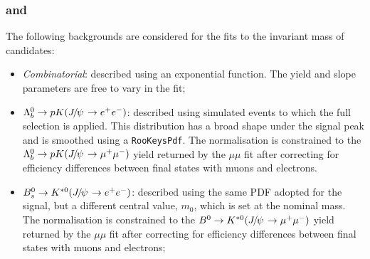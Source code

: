 \subsubsection*{\BdToKstJPs and \BdToKstPsi}

The following backgrounds are considered for the fits to the invariant mass of \BdToKstJPsee candidates:
%
\begin{itemize}

\item \textit{Combinatorial}: described using an exponential function. The yield and slope parameters are free to vary in the fit;

\item $\Lb\to pK(\jpsi\to\ee)$: described using simulated events to which the full selection is applied. This distribution has a broad shape under the signal peak and is smoothed using a \texttt{RooKeysPdf}. The normalisation is constrained to the $\Lb\to pK(\jpsi\to\mumu)$ yield returned by the $\mu\mu$ fit after correcting for efficiency differences between final states with muons and electrons.

\item $\Bs\to\Kstarz(\jpsi\to\ee)$: described using the same PDF adopted for the signal, but a different central value, $m_0$, which is set at the \Bs nominal mass. The normalisation is constrained to the $\Bd\to\Kstarz(\jpsi\to\mumu)$ yield returned by the $\mu\mu$ fit after correcting for efficiency differences between final states with muons and electrons;

\end{itemize}

